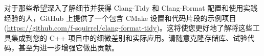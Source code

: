 对于那些希望深入了解细节并获得 Clang-Tidy 和 Clang-Format 配置和使用实践经验的人，GitHub 上提供了一个包含 CMake 设置和代码片段的示例项目 (\url{https://github.com/f-squirrel/clang-format-tidy})。这将使您更好地了解将这些工具集成到您的 C++ 项目中的细微差别和实际应用。请随意克隆存储库、试验代码，甚至为进一步增强它做出贡献。